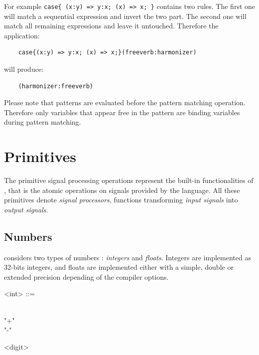 \documentclass[a4paper,10pt]{book}
\begin{document}
For example \lstinline'case{ (x:y) => y:x; (x) => x; }' contains two rules. The first one will match a sequential expression and invert the two part. The second one will match all remaining expressions and leave it untouched. Therefore the application:

\begin{lstlisting}
	case{(x:y) => y:x; (x) => x;}(freeverb:harmonizer)
\end{lstlisting}

will produce:

\begin{lstlisting}
	(harmonizer:freeverb)
\end{lstlisting}

Please note that patterns are evaluated before the pattern matching operation. Therefore only variables that appear free in the pattern are binding variables during pattern matching. 



\section{Primitives}
\label{primitives}
The primitive signal processing operations represent the built-in functionalities of \faust, that is the atomic operations on signals provided by the language. All these primitives denote \emph{signal processors}, functions transforming \emph{input signals} into \emph{output signals}.

\subsection{Numbers}

\faust considers two types of numbers : \textit{integers} and \textit{floats}. Integers are implemented as 32-bits integers, and floats are implemented either with a simple, double or extended precision depending of the compiler options.

\begin{grammar}
  <int> ::= 
  \begin{syntdiag}
    \begin{stack}
      \\ "+" \\ "-"
    \end{stack}
    \begin{rep}
      <digit>
    \end{rep}
  \end{syntdiag}
\end{grammar}
\end{document}
